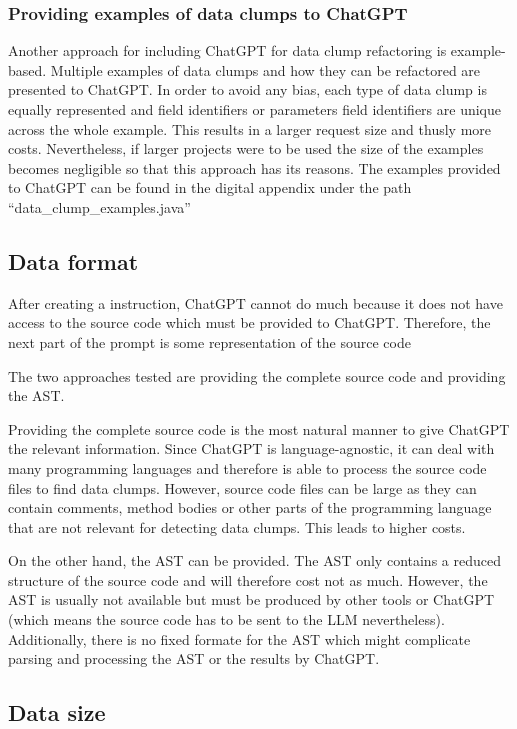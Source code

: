 \subsubsection{Providing examples of data clumps to ChatGPT}

Another approach for including ChatGPT for data clump refactoring is example-based. Multiple examples of data clumps and how they can be refactored are presented to ChatGPT. In order to avoid any bias, each type of data clump is equally represented and field identifiers or parameters field identifiers are unique across the whole example. This results in a larger request size and thusly more costs. Nevertheless, if larger projects were to be used the size of the examples becomes negligible so that this approach has its reasons. The examples provided to ChatGPT can be found in the digital appendix under the path \enquote{data\_clump\_examples.java} 


\subsection{Data format}

After creating a instruction, ChatGPT cannot do much because it does not have access to the source code which must be provided to ChatGPT. Therefore, the next part of the prompt is some representation of the source code

The two approaches tested are providing the complete source code and providing the \ac{AST}.

Providing the complete source code is the most natural manner to give ChatGPT the relevant information. Since ChatGPT is language-agnostic, it can deal with many programming languages and therefore is able to process the source code files to find data clumps. However, source code files can be large as they can contain comments, method bodies or other parts of the programming language that are not relevant for detecting data clumps. This leads to higher costs.

On the other hand, the \ac{AST} can be provided. The \ac{AST} only contains a reduced structure of the source code and will therefore cost not as much. However, the \ac{AST} is usually not available but must be produced by other tools or ChatGPT (which means the source code has to be sent to the \ac{LLM} nevertheless). Additionally, there is no fixed formate for the \ac{AST} which might complicate parsing and processing the \ac{AST} or the results by ChatGPT.

\subsection{Data size}


